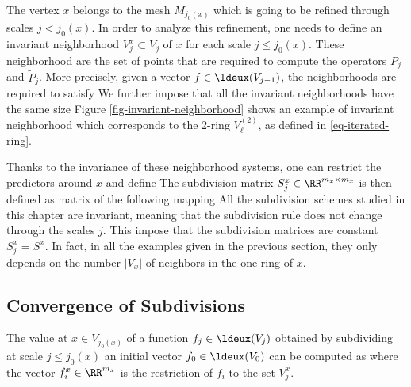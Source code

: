 The vertex $x$ belongs to the mesh $M_{j_0(x)}$ which is going to be refined through scales $j<j_0(x)$. In order to analyze this refinement, one needs to define an invariant neighborhood $V_j^x \subset V_j$ of $x$ for each scale $j \leq j_0(x)$. These neighborhood are the set of points that are required to compute the operators $P_j$ and $\tilde P_j$. More precisely, given a vector $f \in \ldeux(V_{j-1})$, the neighborhoods are required to satisfy 
We further impose that all the invariant neighborhoods have the same size
Figure \ref{fig-invariant-neighborhood} shows an example of invariant neighborhood which corresponds to the 2-ring $V_\ell^{(2)}$, as defined in \eqref{eq-iterated-ring}. 

Thanks to the invariance of these neighborhood systems, one can restrict the predictors around $x$ and define
The subdivision matrix $S_j^x \in \RR^{ m_x \times m_x }$ is then defined as matrix of the following mapping
All the subdivision schemes studied in this chapter are invariant, meaning that the subdivision rule does not change through the scales $j$. This impose that the subdivision matrices are constant $S_j^x = S^x$. In fact, in all the examples given in the previous section, they only depends on the number $|V_x|$ of neighbors in the one ring of $x$.




\subsection{Convergence of Subdivisions}

The value at $x \in V_{j_0(x)}$ of a function $f_j \in \ldeux(V_j)$ obtained by subdividing at scale $j \leq j_0(x)$ an initial vector  $f_0 \in \ldeux(V_0)$ can be computed as
where the vector $f_i^x \in \RR^{m_x}$ is the restriction of $f_i$ to the set $V_j^x$. 

